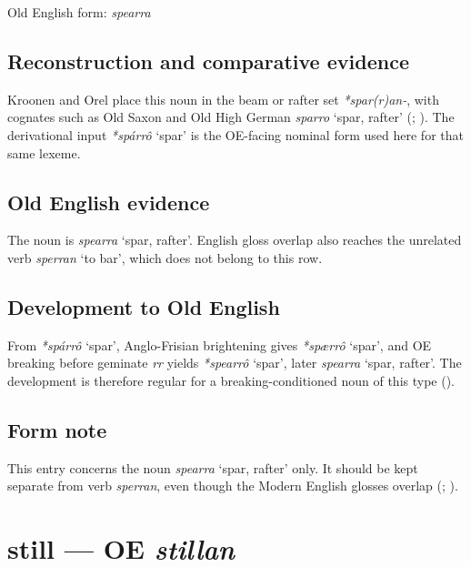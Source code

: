 \documentclass[
  british,
  a4paper,
  openany]{book}
\providecommand{\Recon}[1]{\emph{*#1}}
{\catcode`→=\active \global\def→{\ensuremath{\rightarrow}}}
\providecommand{\texorpdfstring}[2]{#1}
\providecommand{\Recon}[1]{\emph{*#1}}
{\catcode`→=\active \global\def→{\ensuremath{\rightarrow}}}
\begin{document}
Old English form: \emph{spearra}

\subsection{Reconstruction and comparative
evidence}\label{reconstruction-and-comparative-evidence-49}

Kroonen and Orel place this noun in the beam or rafter set
\emph{*spar(r)an-}, with cognates such as Old Saxon and Old High German
{\emph{sparro}} `spar, rafter' (; ). The derivational input
\Recon{spárrô} `spar' is the OE-facing nominal form used here for that
same lexeme.

\subsection{Old English evidence}\label{old-english-evidence-49}

The noun is {\emph{spearra}} `spar, rafter'. English gloss overlap also
reaches the unrelated verb \emph{sperran} `to bar', which does not
belong to this row.

\subsection{Development to Old
English}\label{development-to-old-english-49}

From \Recon{spárrô} `spar', Anglo-Frisian brightening gives
\Recon{spærrô} `spar', and OE breaking before geminate \emph{rr} yields
\Recon{spearrô} `spar', later {\emph{spearra}} `spar, rafter'. The
development is therefore regular for a breaking-conditioned noun of this
type ().

\subsection{Form note}\label{form-note-19}

This entry concerns the noun {\emph{spearra}} `spar, rafter' only. It
should be kept separate from verb \emph{sperran}, even though the Modern
English glosses overlap (;
).

\section{\texorpdfstring{still --- OE
\emph{stillan}}{still --- OE stillan}}\label{still-oe-stillan}
\end{document}
